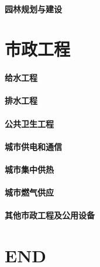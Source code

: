 \documentclass[UTF8]{../../ApplicationUniverse}
\begin{document}
\subsubsection{园林规划与建设}


\chapter{市政工程}
\subsubsection{给水工程}
\subsubsection{排水工程}
\subsubsection{公共卫生工程}
\subsubsection{城市供电和通信}
\subsubsection{城市集中供热}
\subsubsection{城市燃气供应}
\subsubsection{其他市政工程及公用设备}





\chapter{END}
\end{document}
